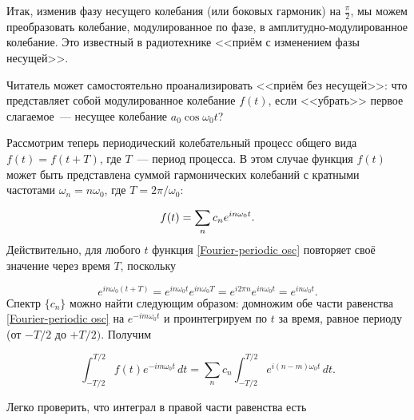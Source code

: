 %

Итак, изменив фазу несущего колебания (или боковых гармоник) на  $\frac{\pi}{2}$, мы можем преобразовать колебание,
модулированное по фазе, в амплитудно-модулированное колебание. Это известный в радиотехнике <<приём с изменением фазы несущей>>.

Читатель может самостоятельно проанализировать <<приём без несущей>>: что представляет собой модулированное колебание
$f(t)$, если <<убрать>> первое слагаемое~--- несущее колебание $a_0\cos\omega_0t$?


Рассмотрим теперь периодический колебательный процесс общего вида $f(t)=f(t+T)$, где $T$~--- период процесса. В этом
случае функция $f(t)$ может быть представлена суммой гармонических колебаний с кратными частотами $\omega_n=n\omega_0$,
где $T=2\pi/\omega_0$:

\begin{equation}
	\eqmark{Fourier-periodic osc}
	f(t)=\sum_n c_n e^{in\omega_0 t}.
\end{equation}
Действительно, для любого $t$ функция \eqref{Fourier-periodic osc} повторяет своё значение через время $T$, поскольку

\begin{equation*}
	e^{in\omega_0(t+T)}=e^{in\omega_0t}e^{in\omega_0T}=e^{i2\pi n}e^{in\omega_0t}=e^{in\omega_0t}.
\end{equation*}
Спектр $\{c_n\}$ можно найти следующим образом: домножим обе части равенства \eqref{Fourier-periodic osc} на $e^{-im\omega_0 t}$ и
проинтегрируем по $t$ за время, равное периоду (от $-T/2$ до $+T/2)$. Получим

\begin{equation*}
	\int_{-T/2}^{T/2} f(t)e^{-im\omega_0t}\,dt=\sum_n c_n\int_{-T/2}^{T/2} e^{i(n-m)\omega_0 t}\,dt.
\end{equation*}

Легко проверить, что интеграл в правой части равенства есть

